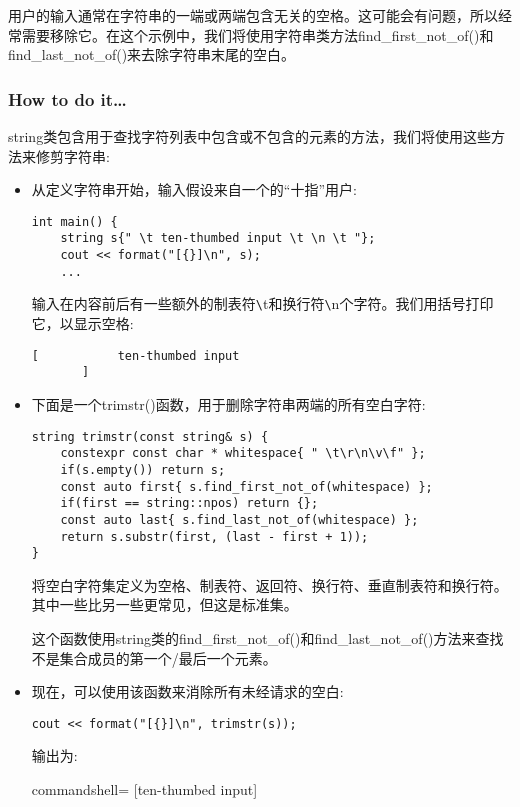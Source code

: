 
用户的输入通常在字符串的一端或两端包含无关的空格。这可能会有问题，所以经常需要移除它。在这个示例中，我们将使用字符串类方法find\_first\_not\_of()和find\_last\_not\_of()来去除字符串末尾的空白。

\subsubsection{How to do it…}

string类包含用于查找字符列表中包含或不包含的元素的方法，我们将使用这些方法来修剪字符串:

\begin{itemize}
\item 
从定义字符串开始，输入假设来自一个的“十指”用户:

\begin{lstlisting}[style=styleCXX]
int main() {
	string s{" \t ten-thumbed input \t \n \t "};
	cout << format("[{}]\n", s);
	...
\end{lstlisting}

输入在内容前后有一些额外的制表符\verb|\|t和换行符\verb|\|n个字符。我们用括号打印它，以显示空格:

\begin{lstlisting}[style=styleCXX]
[           ten-thumbed input
       ]
\end{lstlisting}

\item 
下面是一个trimstr()函数，用于删除字符串两端的所有空白字符:

\begin{lstlisting}[style=styleCXX]
string trimstr(const string& s) {
	constexpr const char * whitespace{ " \t\r\n\v\f" };
	if(s.empty()) return s;
	const auto first{ s.find_first_not_of(whitespace) };
	if(first == string::npos) return {};
	const auto last{ s.find_last_not_of(whitespace) };
	return s.substr(first, (last - first + 1));
}
\end{lstlisting}

将空白字符集定义为空格、制表符、返回符、换行符、垂直制表符和换行符。其中一些比另一些更常见，但这是标准集。

这个函数使用string类的find\_first\_not\_of()和find\_last\_not\_of()方法来查找不是集合成员的第一个/最后一个元素。

\item 
现在，可以使用该函数来消除所有未经请求的空白:

\begin{lstlisting}[style=styleCXX]
cout << format("[{}]\n", trimstr(s));
\end{lstlisting}

输出为:

\begin{tcblisting}{commandshell={}}
[ten-thumbed input]
\end{tcblisting}
\end{itemize}


